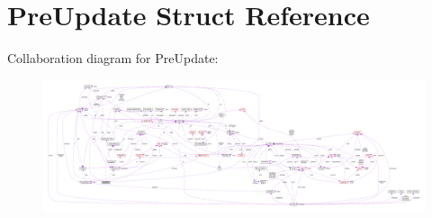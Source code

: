 \hypertarget{structPreUpdate}{}\section{Pre\+Update Struct Reference}
\label{structPreUpdate}


Collaboration diagram for Pre\+Update\+:\nopagebreak
\begin{figure}[H]
\begin{center}
\leavevmode
\includegraphics[width=350pt]{structPreUpdate__coll__graph}
\end{center}
\end{figure}
